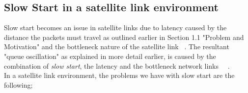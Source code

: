 \subsection{Slow Start in a satellite link environment}
Slow start becomes an issue in satellite links due to latency caused by the distance the packets must travel as outlined earlier in Section 1.1 "Problem and Motivation" and the bottleneck nature of the satellite link ~\cite{13}. The resultant "queue oscillation" as explained in more detail earlier, is caused by the combination of \emph{slow start}, the latency and the bottleneck network links ~\cite{4}~\cite{5}. \\

In a satellite link environment, the problems we have with slow start are the following; \\

